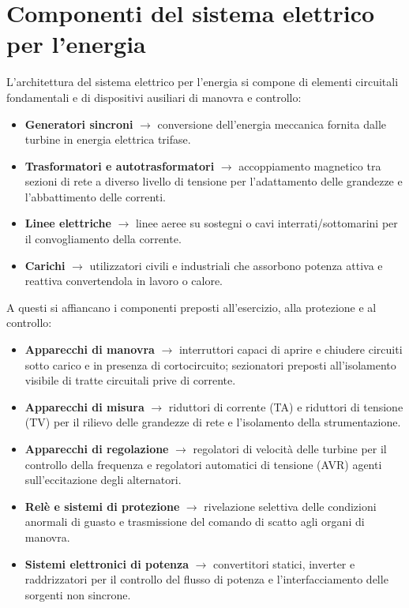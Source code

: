 \section{Componenti del sistema elettrico per l'energia}
L'architettura del sistema elettrico per l'energia si compone di elementi circuitali fondamentali e di dispositivi ausiliari di manovra e controllo:
\begin{itemize}
    \item \textbf{Generatori sincroni} $\rightarrow$ conversione dell'energia meccanica fornita dalle turbine in energia elettrica trifase.
    \item \textbf{Trasformatori e autotrasformatori} $\rightarrow$ accoppiamento magnetico tra sezioni di rete a diverso livello di tensione per l'adattamento delle grandezze e l'abbattimento delle correnti.
    \item \textbf{Linee elettriche} $\rightarrow$ linee aeree su sostegni o cavi interrati/sottomarini per il convogliamento della corrente.
    \item \textbf{Carichi} $\rightarrow$ utilizzatori civili e industriali che assorbono potenza attiva e reattiva convertendola in lavoro o calore.
\end{itemize}

A questi si affiancano i componenti preposti all'esercizio, alla protezione e al controllo:
\begin{itemize}
    \item \textbf{Apparecchi di manovra} $\rightarrow$ interruttori capaci di aprire e chiudere circuiti sotto carico e in presenza di cortocircuito; sezionatori preposti all'isolamento visibile di tratte circuitali prive di corrente.
    \item \textbf{Apparecchi di misura} $\rightarrow$ riduttori di corrente (TA) e riduttori di tensione (TV) per il rilievo delle grandezze di rete e l'isolamento della strumentazione.
    \item \textbf{Apparecchi di regolazione} $\rightarrow$ regolatori di velocità delle turbine per il controllo della frequenza e regolatori automatici di tensione (AVR) agenti sull'eccitazione degli alternatori.
    \item \textbf{Relè e sistemi di protezione} $\rightarrow$ rivelazione selettiva delle condizioni anormali di guasto e trasmissione del comando di scatto agli organi di manovra.
    \item \textbf{Sistemi elettronici di potenza} $\rightarrow$ convertitori statici, inverter e raddrizzatori per il controllo del flusso di potenza e l'interfacciamento delle sorgenti non sincrone.
\end{itemize}

